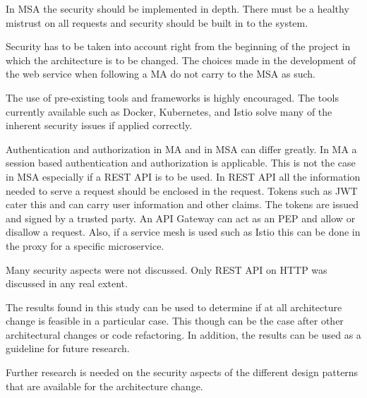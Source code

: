 \begin{sloppypar}
    In MSA the security should be implemented in depth. There must be a healthy
    mistrust on all requests and security should be built in to the system.
\end{sloppypar}
\begin{sloppypar}
    Security has to be taken into account right from the beginning of the
    project in which the architecture is to be changed. The choices made in the
    development of the web service when following a MA do not carry to the MSA
    as such.
\end{sloppypar}
\begin{sloppypar}
    The use of pre-existing tools and frameworks is highly encouraged. The tools
    currently available such as Docker, Kubernetes, and Istio solve many of the
    inherent security issues if applied correctly.
\end{sloppypar}
\begin{sloppypar}
    Authentication and authorization in MA and in MSA can differ greatly. In MA
    a session based authentication and authorization is applicable. This is not
    the case in MSA especially if a REST API is to be used. In REST API all the
    information needed to serve a request should be enclosed in the request.
    Tokens such as JWT cater this and can carry user information and other
    claims. The tokens are issued and signed by a trusted party. An API Gateway
    can act as an PEP and allow or disallow a request. Also, if a service mesh
    is used such as Istio this can be done in the proxy for a specific
    microservice.
\end{sloppypar}
\begin{sloppypar}
    Many security aspects were not discussed. Only REST API on HTTP was 
    discussed in any real extent. 
\end{sloppypar}
\begin{sloppypar}
    The results found in this study can be used to determine if at all
    architecture change is feasible in a particular case. This though can be the
    case after other architectural changes or code refactoring. In addition, the
    results can be used as a guideline for future research.
\end{sloppypar}
\begin{sloppypar}
    Further research is needed on the security aspects of the different design
    patterns that are available for the architecture change.
\end{sloppypar}
